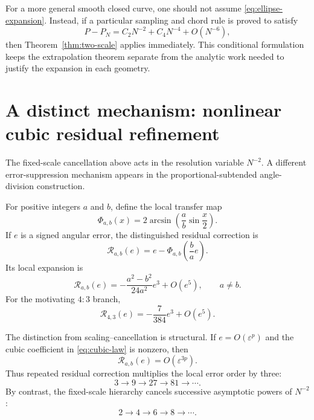 \documentclass[11pt]{article}
\theoremstyle{remark}
\begin{document}
For a more general smooth closed curve, one should not assume
\eqref{eq:ellipse-expansion}.  Instead, if a particular sampling and chord
rule is proved to satisfy
\[
P-P_N
=
C_2N^{-2}+C_4N^{-4}+O(N^{-6}),
\]
then Theorem~\ref{thm:two-scale} applies immediately.  This conditional
formulation keeps the extrapolation theorem separate from the analytic work
needed to justify the expansion in each geometry.

\section{A distinct mechanism: nonlinear cubic residual refinement}

The fixed-scale cancellation above acts in the resolution variable
$N^{-2}$.  A different error-suppression mechanism appears in the
proportional-subtended angle-division construction.

For positive integers $a$ and $b$, define the local transfer map
\[
\Phi_{a,b}(x)
=
2\arcsin\!\left(\frac{a}{b}\sin\frac{x}{2}\right).
\]
If $e$ is a signed angular error, the distinguished residual correction is
\begin{equation}
\label{eq:cubic-residual}
\mathscr{R}_{a,b}(e)
=
e-\Phi_{a,b}\!\left(\frac{b}{a}e\right).
\end{equation}
Its local expansion is
\begin{equation}
\label{eq:cubic-law}
\mathscr{R}_{a,b}(e)
=
-\frac{a^2-b^2}{24a^2}e^3+O(e^5),
\qquad a\ne b.
\end{equation}
For the motivating $4{:}3$ branch,
\begin{equation}
\label{eq:four-three}
\mathscr{R}_{4,3}(e)
=
-\frac{7}{384}e^3+O(e^5).
\end{equation}

The distinction from scaling--cancellation is structural.  If
$e=O(\varepsilon^p)$ and the cubic coefficient in
\eqref{eq:cubic-law} is nonzero, then
\[
\mathscr{R}_{a,b}(e)=O(\varepsilon^{3p}).
\]
Thus repeated residual correction multiplies the local error order by three:
\[
3\longrightarrow9\longrightarrow27\longrightarrow81\longrightarrow\cdots.
\]
By contrast, the fixed-scale hierarchy cancels successive asymptotic powers
of $N^{-2}$:
\[
2\longrightarrow4\longrightarrow6\longrightarrow8\longrightarrow\cdots.
\]
\end{document}
